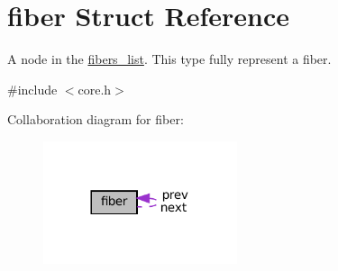 \hypertarget{structfiber}{}\section{fiber Struct Reference}
\label{structfiber}


A node in the \mbox{\hyperlink{structfibers__list}{fibers\+\_\+list}}. This type fully represent a {\ttfamily fiber}.  




{\ttfamily \#include $<$core.\+h$>$}



Collaboration diagram for fiber\+:
\nopagebreak
\begin{figure}[H]
\begin{center}
\leavevmode
\includegraphics[width=161pt]{structfiber__coll__graph}
\end{center}
\end{figure}
